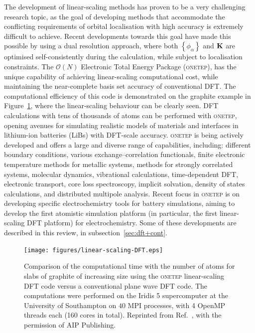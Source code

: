 \documentclass[../main.tex]{subfiles}
\begin{document}
The development of linear-scaling methods has proven to be a very challenging research topic, as the goal of developing methods that accommodate the conflicting requirements of orbital localisation with high accuracy is extremely difficult to achieve. Recent developments towards this goal have made this possible by using a dual resolution approach, where both $\left\{\phi_\alpha\right\}$ and $\bf K$ are optimised self-consistently during the calculation, while subject to localisation constraints. \cite{ONETEP2005,Gillan2007,Mohr2015}
The $\mathcal{O}(N)$ Electronic Total Energy Package (\textsc{onetep}),\cite{ONETEP2020} has the unique capability of achieving linear-scaling computational cost, while maintaining the near-complete basis set accuracy of conventional DFT. The computational efficiency of this code is demonstrated on the graphite example in Figure~\ref{fig:ls}, where the linear-scaling behaviour can be clearly seen. DFT calculations with tens of thousands of atoms can be performed with \textsc{onetep}, opening avenues for simulating realistic models of materials and interfaces in lithium-ion batteries (LiBs) with DFT-scale accuracy. \textsc{onetep} is being actively developed and offers a large and diverse range of capabilities, including: different boundary conditions, various exchange–correlation functionals, finite electronic temperature methods for metallic systems, methods for strongly correlated systems, molecular dynamics, vibrational calculations, time-dependent DFT, electronic transport, core loss spectroscopy, implicit solvation, density of states calculations, and distributed multipole analysis. \cite{ONETEP2020} Recent focus in \textsc{onetep} is on developing specific electrochemistry tools for battery simulations, aiming to develop the first atomistic simulation platform (in particular, the first linear-scaling DFT platform) for electrochemistry. Some of these developments are described in this review, in subsection~\ref{sec:dft+cont}.

\begin{figure}
    \centering
    \texttt{[image: figures/linear-scaling-DFT.eps]}
    \caption{Comparison of the computational time with the number of atoms for slabs of graphite of increasing size using the \textsc{onetep} linear-scaling DFT code versus a conventional plane wave DFT code. The computations were performed on the Iridis 5 supercomputer at the University of Southampton on $40$ MPI processes, with 4 OpenMP threads each (160 cores in total). Reprinted from Ref.~, with the permission of AIP Publishing.}
    \label{fig:ls}
\end{figure}
\end{document}
